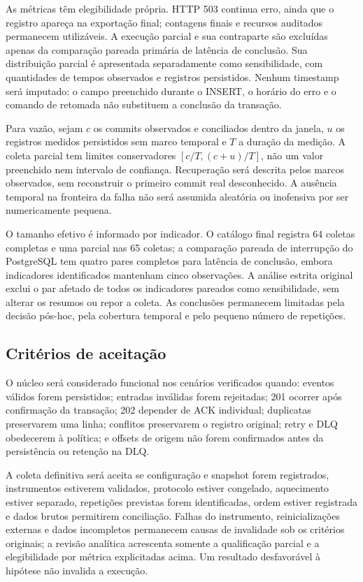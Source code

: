 As métricas têm elegibilidade própria. HTTP 503 continua erro, ainda que o registro apareça na exportação final; contagens finais e recursos auditados permanecem utilizáveis. A execução parcial e sua contraparte são excluídas apenas da comparação pareada primária de latência de conclusão. Sua distribuição parcial é apresentada separadamente como sensibilidade, com quantidades de tempos observados e registros persistidos. Nenhum timestamp será imputado: o campo preenchido durante o INSERT, o horário do erro e o comando de retomada não substituem a conclusão da transação.

Para vazão, sejam $c$ os commits observados e conciliados dentro da janela, $u$ os registros medidos persistidos sem marco temporal e $T$ a duração da medição. A coleta parcial tem limites conservadores $[c/T,(c+u)/T]$, não um valor preenchido nem intervalo de confiança. Recuperação será descrita pelos marcos observados, sem reconstruir o primeiro commit real desconhecido. A ausência temporal na fronteira da falha não será assumida aleatória ou inofensiva por ser numericamente pequena.

O tamanho efetivo é informado por indicador. O catálogo final registra 64 coletas completas e uma parcial nas 65 coletas; a comparação pareada de interrupção do PostgreSQL tem quatro pares completos para latência de conclusão, embora indicadores identificados mantenham cinco observações. A análise estrita original exclui o par afetado de todos os indicadores pareados como sensibilidade, sem alterar os resumos ou repor a coleta. As conclusões permanecem limitadas pela decisão pós-hoc, pela cobertura temporal e pelo pequeno número de repetições.

\subsection{Critérios de aceitação}
O núcleo será considerado funcional nos cenários verificados quando: eventos válidos forem persistidos; entradas inválidas forem rejeitadas; 201 ocorrer após confirmação da transação; 202 depender de ACK individual; duplicatas preservarem uma linha; conflitos preservarem o registro original; retry e DLQ obedecerem à política; e offsets de origem não forem confirmados antes da persistência ou retenção na DLQ.

A coleta definitiva será aceita se configuração e snapshot forem registrados, instrumentos estiverem validados, protocolo estiver congelado, aquecimento estiver separado, repetições previstas forem identificadas, ordem estiver registrada e dados brutos permitirem conciliação. Falhas do instrumento, reinicializações externas e dados incompletos permanecem causas de invalidade sob os critérios originais; a revisão analítica acrescenta somente a qualificação parcial e a elegibilidade por métrica explicitadas acima. Um resultado desfavorável à hipótese não invalida a execução.

